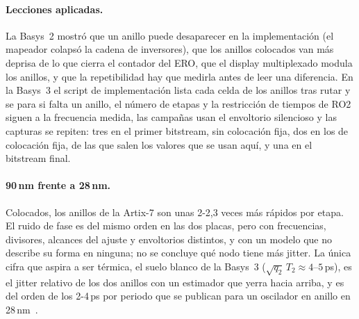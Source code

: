 \paragraph{Lecciones aplicadas.} La Basys~2 mostró que un anillo puede
desaparecer en la implementación (el mapeador colapsó la cadena de
inversores), que los anillos colocados van más deprisa de lo que cierra el
contador del \ac{ERO}, que el display multiplexado modula los anillos, y
que la repetibilidad hay que medirla antes de leer una diferencia. En la
Basys~3 el script de implementación lista cada celda de los anillos tras
rutar y se para si falta un anillo, el número de etapas y la restricción de
tiempos de RO2 siguen a la frecuencia medida, las campañas usan el
envoltorio silencioso y las capturas se repiten: tres en el primer
bitstream, sin colocación fija, dos en los de colocación fija, de las
que salen los valores que se usan aquí, y una en el bitstream final.

\paragraph{90\,nm frente a 28\,nm.} Colocados, los anillos de la Artix-7
son unas 2-2,3 veces más rápidos por etapa. El ruido de fase es del mismo
orden en las dos placas, pero con frecuencias, divisores, alcances del
ajuste y envoltorios distintos, y con un modelo que no describe su forma en
ninguna; no se concluye qué nodo tiene más jitter. La única cifra que
aspira a ser térmica, el suelo blanco de la Basys~3
($\sqrt{q_2}\,T_2 \approx 4$--$5$\,ps), es el jitter relativo de los dos
anillos con un estimador que yerra hacia arriba, y es del orden de los
2-4\,ps por periodo que se publican para un oscilador en anillo en
28\,nm~\cite{petura_2016_survey}.
